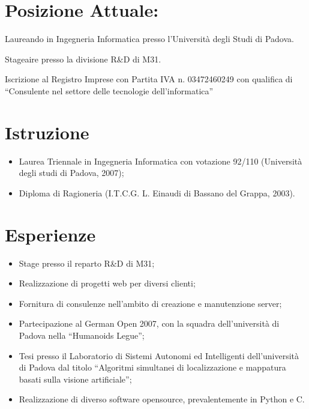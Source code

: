 \documentclass[pdftex, a4paper, 11pt]{article}
\begin{document}
\section*{Posizione Attuale:}

\hspace{0.58cm}Laureando in Ingegneria Informatica presso l'Universit\`a degli
Studi di Padova. 

Stageaire presso la divisione R\&D di M31.

Iscrizione al Registro Imprese con Partita IVA
n. 03472460249 con qualifica di ``Consulente nel settore delle
tecnologie dell'informatica''


\section*{Istruzione}
\begin{itemize}
\item Laurea Triennale in Ingegneria Informatica con votazione 92/110 (Universit\`a degli
  studi di Padova, 2007);
\item Diploma di Ragioneria (I.T.C.G. L. Einaudi di Bassano del Grappa,
  2003).
\end{itemize}

\section*{Esperienze}
\begin{itemize}
\item Stage presso il reparto R\&D di M31;
\item Realizzazione di progetti web per diversi clienti;
\item Fornitura di consulenze nell'ambito di creazione e manutenzione server;
\item Partecipazione al German Open 2007, con la squadra
  dell'universit\`a di Padova nella ``Humanoids Legue'';
\item Tesi presso il Laboratorio di Sistemi Autonomi ed
  Intelligenti dell'universit\`a di Padova dal titolo ``Algoritmi
  simultanei di localizzazione e mappatura basati sulla visione artificiale'';
\item Realizzazione di diverso software opensource,
  prevalentemente in Python e C.
\end{itemize}
\end{document}
